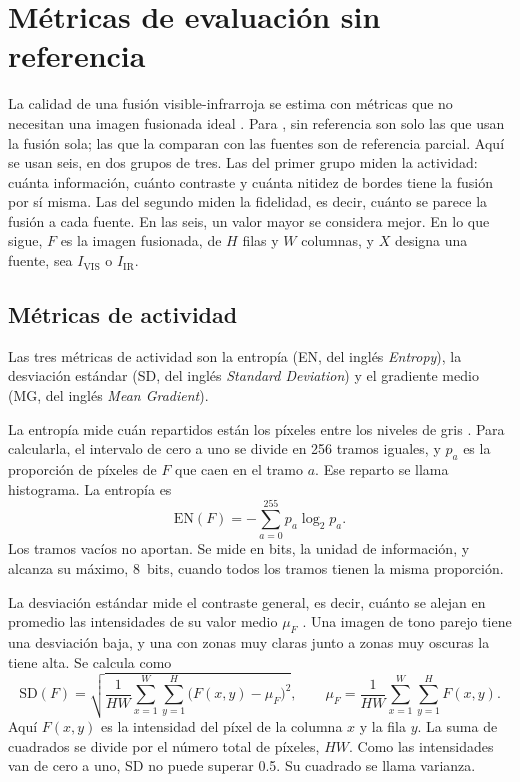 \section{Métricas de evaluación sin referencia}
\label{sec:metricas}

La calidad de una fusión visible-infrarroja se estima con métricas que no necesitan una imagen fusionada
ideal \parencite{ma2019, singh2023}. Para \textcite{singh2023}, sin referencia son solo las que usan la
fusión sola; las que la comparan con las fuentes son de referencia parcial. Aquí se usan seis, en
dos grupos de tres. Las del primer grupo miden la actividad: cuánta información, cuánto contraste y
cuánta nitidez de bordes tiene la fusión por sí misma. Las del segundo miden la fidelidad, es decir,
cuánto se parece la fusión a cada fuente. En las seis, un valor mayor se considera mejor. En lo que
sigue, $F$ es la imagen fusionada, de $H$ filas y $W$ columnas, y $X$ designa una fuente, sea
$I_{\mathrm{VIS}}$ o $I_{\mathrm{IR}}$.

\subsection{Métricas de actividad}

Las tres métricas de actividad son la entropía (EN, del inglés \textit{Entropy}), la desviación estándar
(SD, del inglés \textit{Standard Deviation}) y el gradiente medio (MG, del inglés \textit{Mean Gradient}).

La entropía mide cuán repartidos están los píxeles entre los niveles de gris
\parencite{singh2023, ortegarodriguez2025}. Para calcularla, el
intervalo de cero a uno se divide en 256 tramos iguales, y $p_a$ es la proporción de píxeles de $F$ que
caen en el tramo $a$. Ese reparto se llama histograma. La entropía es
\begin{equation} \mathrm{EN}(F) = -\sum_{a=0}^{255} p_a \log_2 p_a. \label{eq:met-en} \end{equation}
Los tramos vacíos no aportan. Se mide en bits, la unidad de información, y alcanza su máximo, 8~bits,
cuando todos los tramos tienen la misma proporción.

La desviación estándar mide el contraste general, es decir, cuánto se alejan en promedio las
intensidades de su valor medio $\mu_F$ \parencite{singh2023, ortegarodriguez2025}. Una imagen de tono
parejo tiene una desviación baja, y una con zonas muy claras junto a zonas muy oscuras la tiene alta. Se
calcula como
\begin{equation} \mathrm{SD}(F) = \sqrt{\frac{1}{HW}\sum_{x=1}^{W}\sum_{y=1}^{H}\bigl(F(x,y)-\mu_F\bigr)^2}, \qquad \mu_F = \frac{1}{HW}\sum_{x=1}^{W}\sum_{y=1}^{H}F(x,y). \label{eq:met-sd} \end{equation}
Aquí $F(x,y)$ es la intensidad del píxel de la columna $x$ y la fila $y$. La suma de cuadrados se
divide por el número total de píxeles, $HW$. Como las intensidades van de cero a uno, SD no puede
superar 0.5. Su cuadrado se llama varianza.

